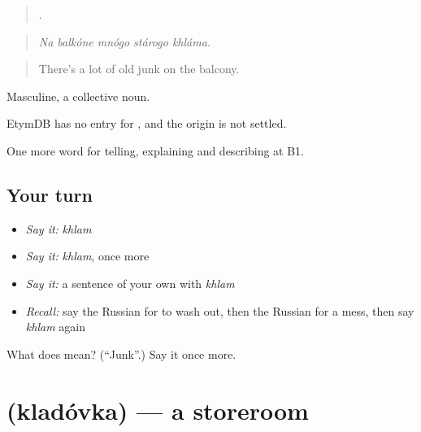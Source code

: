 \begin{quote}
    .
\end{quote}

\begin{quote}
\emph{Na balkóne mnógo stárogo khláma.}
\end{quote}

\begin{quote}
There's a lot of old junk on the balcony.
\end{quote}

Masculine, a collective noun.

\begin{cousinweb}
EtymDB has no entry for \emph{}, and the origin is not settled.
\end{cousinweb}

\begin{grammarlens}[title={What you've built}]
One more word for telling, explaining and describing at B1.
\end{grammarlens}

\subsection*{Your turn}
\begin{itemize}
\raggedright
  \item \emph{Say it:} \emph{khlam}
  \item \emph{Say it:} \emph{khlam}, once more
  \item \emph{Say it:} a sentence of your own with \emph{khlam}
  \item \emph{Recall:} say the Russian for to wash out, then the Russian for a mess, then say \emph{khlam} again
\end{itemize}

\begin{tcolorbox}[breakable,colback=teal!4,colframe=teal!35!black,title={Before you move on}]
What does  mean? (\textquotedblleft{}Junk\textquotedblright{}.) Say it once more.
\end{tcolorbox}
\section[\texorpdfstring{\ru{кладовка} (kladóvka)}{кладовка (kladóvka)}]{ (kladóvka) — a storeroom}

\label{lesson:RU-C531-kladovka}



